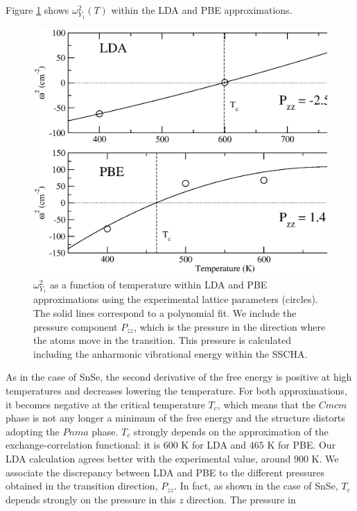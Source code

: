 Figure \ref{transition-sns} shows $\omega_{Y_{1}}^{2}(T)$ within the LDA and PBE approximations.
\begin{figure}[h]
\includegraphics[width=\linewidth]{Figures/freq-sns.eps}
\caption[Phonon collapse in SnS.]{$\omega_{Y_{1}}^{2}$ as a function of temperature within LDA and PBE approximations using the experimental lattice parameters (circles). The solid lines correspond to a polynomial fit. We include the pressure component
$P_{zz}$, which is the pressure in the direction where the atoms move in the transition.  This pressure is calculated including the anharmonic vibrational energy within the SSCHA.}
\label{transition-sns}
\end{figure}
As in the case of SnSe\cite{aseginolaza2019phonon}, the second derivative of the free energy is positive at high temperatures and decreases lowering the temperature. For both approximations, it becomes negative at the critical
temperature $T_c$, which means that the $Cmcm$ phase is not any longer a minimum of the free energy and the structure distorts adopting the $Pnma$ phase. $T_{c}$ strongly depends on the approximation of the exchange-correlation
functional: it is $600$ K for LDA and $465$ K for PBE. Our LDA calculation agrees better with the experimental value, around $900$ K\cite{chattopadhyay1986neutron}. We associate the discrepancy between LDA and PBE  to the different
pressures obtained in the transition direction, $P_{zz}$. In fact, as shown in the case of SnSe\cite{aseginolaza2019phonon}, $T_{c}$ depends strongly on the pressure in this $z$ direction. The pressure in
